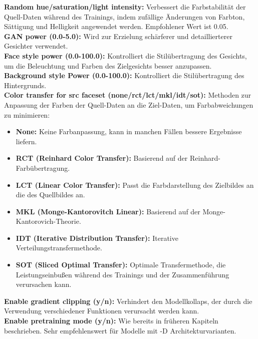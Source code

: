 \textbf{Random hue/saturation/light intensity:} Verbessert die Farbstabilität der Quell-Daten während des Trainings, indem zufällige Änderungen von Farbton, Sättigung und Helligkeit angewendet werden.
Empfohlener Wert ist 0.05.\\
\textbf{GAN power (0.0-5.0):} Wird zur Erzielung schärferer und detaillierterer Gesichter verwendet.\\
\textbf{Face style power (0.0-100.0):} Kontrolliert die Stilübertragung des Gesichts, um die Beleuchtung und Farben des Zielgesichts besser anzupassen.\\
\textbf{Background style Power (0.0-100.0):} Kontrolliert die Stilübertragung des Hintergrunds.\\
\textbf{Color transfer for src faceset (none/rct/lct/mkl/idt/sot):} Methoden zur Anpassung der Farben der Quell-Daten an die Ziel-Daten, um Farbabweichungen zu minimieren:
\begin{itemize}
    \item \textbf{None:} Keine Farbanpassung, kann in manchen Fällen bessere Ergebnisse liefern.
    \item \textbf{RCT (Reinhard Color Transfer):} Basierend auf der Reinhard-Farbübertragung.
    \item \textbf{LCT (Linear Color Transfer):} Passt die Farbdarstellung des Zielbildes an die des Quellbildes an.
    \item \textbf{MKL (Monge-Kantorovitch Linear):} Basierend auf der Monge-Kantorovich-Theorie.
    \item \textbf{IDT (Iterative Distribution Transfer):} Iterative Verteilungstransfermethode.
    \item \textbf{SOT (Sliced Optimal Transfer):} Optimale Transfermethode, die Leistungseinbußen während des Trainings und der Zusammenführung verursachen kann.
\end{itemize}
\textbf{Enable gradient clipping (y/n):} Verhindert den Modellkollaps, der durch die Verwendung verschiedener Funktionen verursacht werden kann.\\
\textbf{Enable pretraining mode (y/n):} Wie bereits in früheren Kapiteln beschrieben.
Sehr empfehlenswert für Modelle mit -D Architekturvarianten.\\[0.5cm]

